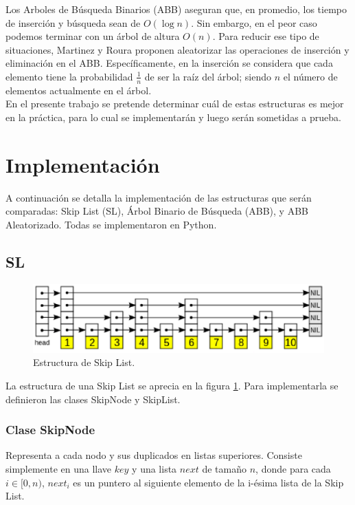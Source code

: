 \documentclass[12pt,letterpaper]{article}
\begin{document}
Los Arboles de Búsqueda Binarios (ABB) aseguran que, en promedio, los tiempo de inserción y búsqueda sean de $O(\log{n})$. Sin embargo, en el peor caso podemos terminar con un árbol de altura $O(n)$. Para reducir ese tipo de situaciones, Martinez y Roura proponen aleatorizar las operaciones de inserción y eliminación en el ABB. Específicamente, en la inserción se considera que cada elemento tiene la probabilidad $\frac{1}{n}$ de ser la raíz del árbol; siendo $n$ el número de elementos actualmente en el árbol.\\

En el presente trabajo se pretende determinar cuál de estas estructuras es mejor en la práctica, para lo cual se implementarán y luego serán sometidas a prueba.

\section{Implementación}
A continuación se detalla la implementación de las estructuras que serán comparadas: Skip List (SL), Árbol Binario de Búsqueda (ABB), y ABB Aleatorizado. Todas se implementaron en Python.

\subsection{SL}

\begin{figure}[ht]
\centering
\includegraphics[scale=0.75]{skiplist.eps}
\caption{Estructura de Skip List.}
\label{fig:skip}
\end{figure}

La estructura de una Skip List se aprecia en la figura \ref{fig:skip}. Para implementarla se definieron las clases SkipNode y SkipList.

\subsubsection{Clase SkipNode}
Representa a cada nodo y sus duplicados en listas superiores. Consiste simplemente en una llave $key$ y una lista $next$ de tamaño $n$, donde para cada $i \in [0,n)$, $next_{i}$ es un puntero al siguiente elemento de la i-ésima lista de la Skip List.
\end{document}
